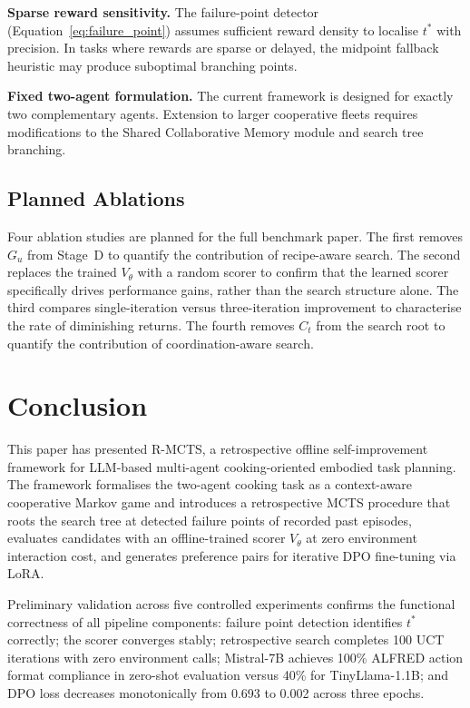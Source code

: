 \documentclass[pdflatex,sn-mathphys-num]{sn-jnl}
\theoremstyle{thmstyleone}
\theoremstyle{thmstyletwo}
\theoremstyle{thmstylethree}
\newcommand{\RMCTS}{\textsc{R-MCTS}}
\newcommand{\Vtheta}{V_{\!\theta}}
\newcommand{\Ct}{C_{t}}
\newcommand{\Gu}{G_{u}}
\begin{document}
\textbf{Sparse reward sensitivity.}
The failure-point detector (Equation~\ref{eq:failure_point}) assumes
sufficient reward density to localise $t^*$ with precision.
In tasks where rewards are sparse or delayed, the midpoint fallback
heuristic may produce suboptimal branching points.

\textbf{Fixed two-agent formulation.}
The current framework is designed for exactly two complementary agents.
Extension to larger cooperative fleets requires modifications to the
Shared Collaborative Memory module and search tree branching.

\subsection{Planned Ablations}

Four ablation studies are planned for the full benchmark paper.
The first removes $\Gu$ from Stage~D to quantify the contribution of
recipe-aware search.
The second replaces the trained $\Vtheta$ with a random scorer to
confirm that the learned scorer specifically drives performance gains,
rather than the search structure alone.
The third compares single-iteration versus three-iteration improvement
to characterise the rate of diminishing returns.
The fourth removes $\Ct$ from the search root to quantify the
contribution of coordination-aware search.

\section{Conclusion}\label{sec:conclusion}

This paper has presented \RMCTS{}, a retrospective offline
self-improvement framework for LLM-based multi-agent cooking-oriented
embodied task planning.
The framework formalises the two-agent cooking task as a context-aware
cooperative Markov game and introduces a retrospective MCTS procedure
that roots the search tree at detected failure points of recorded past
episodes, evaluates candidates with an offline-trained scorer $\Vtheta$
at zero environment interaction cost, and generates preference pairs
for iterative DPO fine-tuning via LoRA.

Preliminary validation across five controlled experiments confirms the
functional correctness of all pipeline components: failure point
detection identifies $t^*$ correctly; the scorer converges stably;
retrospective search completes 100 UCT iterations with zero environment
calls; Mistral-7B achieves 100\% ALFRED action format compliance in
zero-shot evaluation versus 40\% for TinyLlama-1.1B; and DPO loss
decreases monotonically from 0.693 to 0.002 across three epochs.
\end{document}
